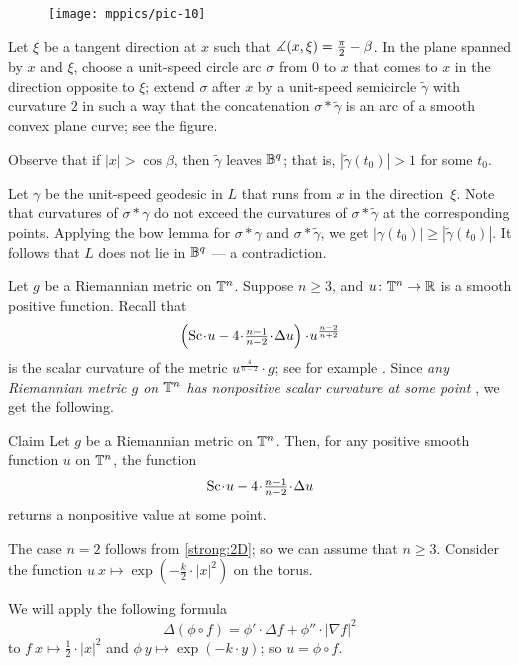 \documentclass[a4paper,10pt]{article}
\begin{document}
\begin{wrapfigure}{r}{39 mm}
\vskip-0mm
\centering
\texttt{[image: mppics/pic-10]}
\vskip0mm
\end{wrapfigure}

Let $\xi$ be a tangent direction at $x$ such that $\measuredangle(x,\xi)\z=\tfrac\pi2-\beta$.
In the plane spanned by $x$ and $\xi$, choose a unit-speed circle arc $\sigma$ from $0$ to $x$ that comes to $x$ in the direction opposite to $\xi$;
extend $\sigma$ after $x$ by a unit-speed semicircle $\tilde\gamma$ with curvature $2$ in such a way that the concatenation $\sigma*\tilde\gamma$ is an arc of a smooth convex plane curve; see the figure.

Observe that if $|x|> \cos\beta$, then $\tilde\gamma$ leaves $\mathbb{B}^q$; that is, $|\tilde\gamma(t_0)|>1$ for some $t_0$.

Let $\gamma$ be the unit-speed geodesic in $L$ that runs from $x$ in the direction~$\xi$.
Note that curvatures of $\sigma*\gamma$ do not exceed the curvatures of $\sigma*\tilde\gamma$ at the corresponding points.
Applying the bow lemma for $\sigma*\gamma$ and $\sigma*\tilde\gamma$, we get $|\gamma(t_0)|\ge |\tilde\gamma(t_0)|$.
It follows that $L$ does not lie in $\mathbb{B}^q$ --- a contradiction.
\qeds

Let $g$ be a Riemannian metric on $\mathbb{T}^n$.
Suppose $n\ge 3$, and $u\colon\mathbb{T}^n\to \mathbb{R}$ is a smooth positive function.
Recall that
\[\left(\Sc\cdot u-4{\cdot}\tfrac{n-1}{n-2}{\cdot}\Delta u\right)\cdot u^{\frac{n-2}{n+2}}\]
is the scalar curvature of the metric $u^{\frac{4}{n-2}}\cdot g$;
see for example \cite[6.3]{aubin}.
Since \emph{any Riemannian metric $g$ on $\mathbb{T}^n$ has nonpositive scalar curvature at some point} \cite[Cor. A]{gromov-lawson}, we get the following.

\begin{thm}{Claim}\label{clm:sc-lap}
Let $g$ be a Riemannian metric on $\mathbb{T}^n$.
Then, for any positive smooth function $u$ on $\mathbb{T}^n$, the function 
\[\Sc\cdot u-4{\cdot}\tfrac{n-1}{n-2}{\cdot}\Delta u\]
returns a nonpositive value at some point.
\end{thm}

The case $n=2$ follows from \ref{strong:2D};
so we can assume that $n\ge 3$.
Consider the function $u\:x\mapsto \exp(-\tfrac k2\cdot|x|^2)$ on the torus.

We will apply the following formula
\[\Delta(\phi\circ f)=\phi'\cdot \Delta f+\phi''\cdot|\nabla f|^2\]
to $f\:x\mapsto \tfrac12\cdot |x|^2$ and $\phi\:y\mapsto \exp(-k\cdot y)$; so $u=\phi\circ f$.
\end{document}
